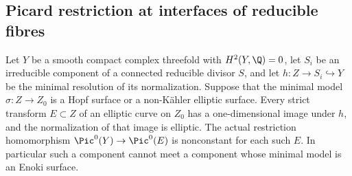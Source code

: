 \subsection{Picard restriction at interfaces of reducible fibres}

\begin{lemma}
\label{st:C.2.INT.1}
Let $Y$ be a smooth compact complex threefold with
$H^2(Y,\Q)=0$, let $S_i$ be an irreducible component of
a connected reducible divisor $S$, and let
$h:Z\to S_i\hookrightarrow Y$ be the minimal resolution
of its normalization. Suppose that the minimal model
$\sigma:Z\to Z_0$ is a Hopf surface or a non-K\"ahler
elliptic surface. Every strict transform $E\subset Z$ of
an elliptic curve on $Z_0$ has a one-dimensional image
under $h$, and the normalization of that image is elliptic.
The actual restriction homomorphism
$\Pic^0(Y)\to\Pic^0(E)$ is nonconstant for each such $E$.
In particular such a component cannot meet a component
whose minimal model is an Enoki surface.
\end{lemma}
